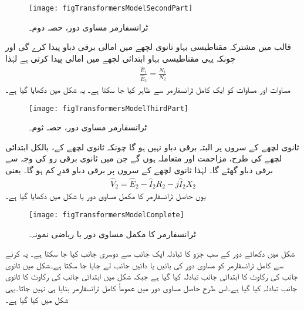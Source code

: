 \begin{figure}
\centering
\texttt{[image: figTransformersModelSecondPart]}
\caption{ٹرانسفارمر مساوی دور، حصہ دوم۔}
\label{شکل_ٹرانسفارمر_ماڈل_حصہ_دوم}
\end{figure}

قالب میں مشترکہ مقناطیسی بہاو ثانوی لچھے میں امالی برقی دباو  پیدا کرے گی اور چونکہ یہی مقناطیسی بہاو ابتدائی لچھے میں   امالی پیدا کرتی ہے لہٰذا
\begin{align}\label{مساوات_ٹرانسفارمر_دباو_رو_شرح}
\frac{\hat{E}_1}{\hat{E}_2}=\frac{N_1}{N_2}
\end{align}
مساوات  اور مساوات   کو ایک کامل ٹرانسفارمر سے ظاہر کیا جا سکتا ہے۔ یہ شکل   میں دکھایا گیا ہے۔
\begin{figure}
\centering
\texttt{[image: figTransformersModelThirdPart]}
\caption{ٹرانسفارمر مساوی دور، حصہ ثوم۔}
\label{شکل_ٹرانسفارمر_ماڈل_حصہ_ثوم}
\end{figure}

ثانوی لچھے کے سروں پر البتہ   برقی دباو نہیں ہو گا چونکہ ثانوی لچھے کے، بالکل ابتدائی لچھے کی طرح، مزاحمت   اور متعاملہ   ہوں گے جن میں ثانوی برقی رو   کی وجہ سے برقی دباو گھٹے گا۔  لہٰذا ثانوی لچھے کے سروں پر برقی دباو  قدرِ کم ہو گا۔ یعنی
\begin{align}
\hat{V}_2=\hat{E}_2-\hat{I}_2 R_2-j \hat{I}_2 X_2
\end{align}
	یوں حاصل ٹرانسفارمر کا مکمل مساوی دور یا  شکل   میں دکھایا گیا ہے۔
\begin{figure}
\centering
\texttt{[image: figTransformersModelComplete]}
\caption{ٹرانسفارمر کا مکمل مساوی دور یا ریاضی نمونہ۔}
\label{شکل_ٹرانسفارمر_مکمل_ماڈل}
\end{figure}

شکل   میں دکھائے دور کے سب جزو کا تبادلہ ایک جانب سے دوسری جانب کیا جا سکتا ہے۔ یہ کرنے سے کامل ٹرانسفارمر کو مساوی دور کی بائیں یا دائیں جانب لے جایا جا سکتا ہے۔شکل    میں ثانوی جانب کی رکاوٹ کا ابتدائی جانب تبادلہ کیا گیا ہے جبکہ شکل    میں ابتدائی جانب کی رکاوٹ کا ثانوی جانب تبادلہ کیا گیا ہے۔اس طرح حاصل مساوی دور میں عموماً کامل ٹرانسفارمر بنایا ہی نہیں جاتا۔یہی شکل    میں کیا گیا ہے۔

